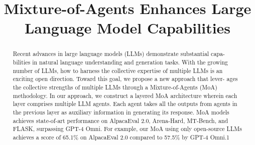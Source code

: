 \title{Mixture-of-Agents Enhances Large Language Model Capabilities}

\maketitle

\begin{abstract}
Recent advances in large language models (LLMs) demonstrate substantial capa- bilities in natural language understanding and generation tasks. With the growing number of LLMs, how to harness the collective expertise of multiple LLMs is an exciting open direction. Toward this goal, we propose a new approach that lever- ages the collective strengths of multiple LLMs through a Mixture-of-Agents (MoA) methodology. In our approach, we construct a layered MoA architecture wherein each layer comprises multiple LLM agents. Each agent takes all the outputs from agents in the previous layer as auxiliary information in generating its response. MoA models achieves state-of-art performance on AlpacaEval 2.0, Arena-Hard, MT-Bench, and FLASK, surpassing GPT-4 Omni. For example, our MoA using only open-source LLMs achieves a score of 65.1\% on AlpacaEval 2.0 compared to 57.5\% by GPT-4 Omni.1
\end{abstract}

